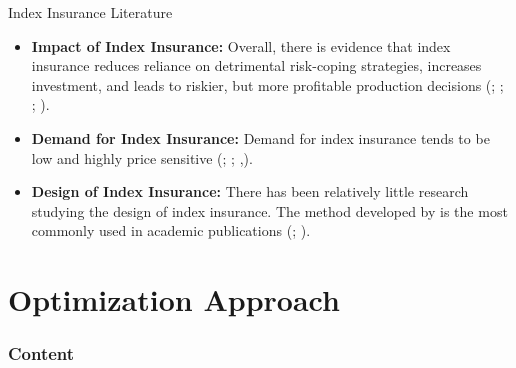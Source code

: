 \documentclass{beamer}
\begin{document}
\begin{frame}{Index Insurance Literature}
 \begin{itemize}
     \item \textbf{Impact of Index Insurance:} Overall, there is evidence that index insurance reduces reliance on detrimental risk-coping strategies, increases investment, and leads to riskier, but more profitable production decisions (\cite{jensen2017agricultural};  \cite{cole2013barriers}; \cite{mobarak2013informal}; \cite{karlan2014agricultural}).
     \item \textbf{Demand for Index Insurance:} Demand for index insurance tends to be low and highly price sensitive (\cite{jensen2017agricultural};  \cite{cole2013barriers}; \cite{cai2020subsidy},\cite{casaburi2018time}).
     \item \textbf{Design of Index Insurance:} There has been relatively little research studying the design of index insurance. The method developed by \cite{chantarat2013designing} is the most commonly used in academic publications (\cite{jensen2019does};  \cite{flatnes2018improving}).
 \end{itemize}
\end{frame}

     



\section{Optimization Approach}
\begin{frame}
    \frametitle{Content}
    \tableofcontents[currentsection]
  \end{frame}
\end{document}
